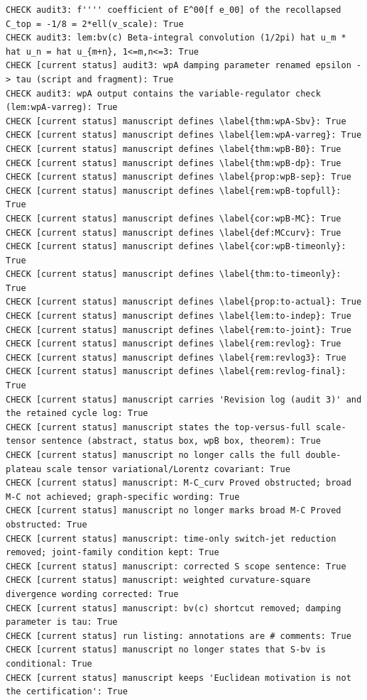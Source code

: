 \documentclass{article}
\theoremstyle{remark}
\begin{document}
\begin{lstlisting}
CHECK audit3: f'''' coefficient of E^00[f e_00] of the recollapsed C_top = -1/8 = 2*ell(v_scale): True
CHECK audit3: lem:bv(c) Beta-integral convolution (1/2pi) hat u_m * hat u_n = hat u_{m+n}, 1<=m,n<=3: True
CHECK [current status] audit3: wpA damping parameter renamed epsilon -> tau (script and fragment): True
CHECK audit3: wpA output contains the variable-regulator check (lem:wpA-varreg): True
CHECK [current status] manuscript defines \label{thm:wpA-Sbv}: True
CHECK [current status] manuscript defines \label{lem:wpA-varreg}: True
CHECK [current status] manuscript defines \label{thm:wpB-B0}: True
CHECK [current status] manuscript defines \label{thm:wpB-dp}: True
CHECK [current status] manuscript defines \label{prop:wpB-sep}: True
CHECK [current status] manuscript defines \label{rem:wpB-topfull}: True
CHECK [current status] manuscript defines \label{cor:wpB-MC}: True
CHECK [current status] manuscript defines \label{def:MCcurv}: True
CHECK [current status] manuscript defines \label{cor:wpB-timeonly}: True
CHECK [current status] manuscript defines \label{thm:to-timeonly}: True
CHECK [current status] manuscript defines \label{prop:to-actual}: True
CHECK [current status] manuscript defines \label{lem:to-indep}: True
CHECK [current status] manuscript defines \label{rem:to-joint}: True
CHECK [current status] manuscript defines \label{rem:revlog}: True
CHECK [current status] manuscript defines \label{rem:revlog3}: True
CHECK [current status] manuscript defines \label{rem:revlog-final}: True
CHECK [current status] manuscript carries 'Revision log (audit 3)' and the retained cycle log: True
CHECK [current status] manuscript states the top-versus-full scale-tensor sentence (abstract, status box, wpB box, theorem): True
CHECK [current status] manuscript no longer calls the full double-plateau scale tensor variational/Lorentz covariant: True
CHECK [current status] manuscript: M-C_curv Proved obstructed; broad M-C not achieved; graph-specific wording: True
CHECK [current status] manuscript no longer marks broad M-C Proved obstructed: True
CHECK [current status] manuscript: time-only switch-jet reduction removed; joint-family condition kept: True
CHECK [current status] manuscript: corrected S scope sentence: True
CHECK [current status] manuscript: weighted curvature-square divergence wording corrected: True
CHECK [current status] manuscript: bv(c) shortcut removed; damping parameter is tau: True
CHECK [current status] run listing: annotations are # comments: True
CHECK [current status] manuscript no longer states that S-bv is conditional: True
CHECK [current status] manuscript keeps 'Euclidean motivation is not the certification': True

\end{lstlisting}
\end{document}
